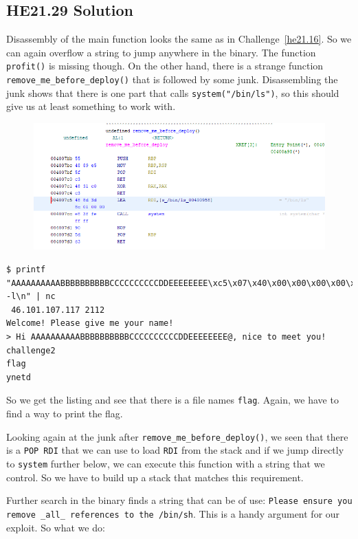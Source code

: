 \documentclass[english,a4paper,nols,noindent]{tufte-handout}
\begin{document}
\hypertarget{he21.29-solution}{%
\subsection{HE21.29 Solution}\label{he21.29-solution}}

\noindent Disassembly of the main function looks the same as in
Challenge~\ref{he21.16}.  So we can again overflow a string to jump anywhere in
the binary.  The function \verb+profit()+ is missing though.  On the other
hand, there is a strange function \verb+remove_me_before_deploy()+ that is
followed by some junk.  Disassembling the junk shows that there is one part
that calls \verb+system("/bin/ls")+, so this should give us at least something
to work with.

\begin{figure}
    \includegraphics[width=150mm]{ch29/remove_me_before_deploy.png}
\end{figure}

\begin{verbatim}
$ printf "AAAAAAAAAABBBBBBBBBBCCCCCCCCCCDDEEEEEEEE\xc5\x07\x40\x00\x00\x00\x00\x00\nls -l\n" | nc
 46.101.107.117 2112
Welcome! Please give me your name!
> Hi AAAAAAAAAABBBBBBBBBBCCCCCCCCCCDDEEEEEEEE@, nice to meet you!
challenge2
flag
ynetd
\end{verbatim} 

So we get the listing and see that there is a file names \verb+flag+.  Again,
we have to find a way to print the flag.

Looking again at the junk after \verb+remove_me_before_deploy()+, we seen that
there is a \verb+POP RDI+ that we can use to load \verb+RDI+ from the stack and
if we jump directly to \verb+system+ further below, we can execute this
function with a string that we control.  So we have to build up a stack that
matches this requirement.

Further search in the binary finds a string that can be of use: 
\verb+Please ensure you remove _all_ references to the /bin/sh+.  This is a handy argument for our exploit.  So what we do:
\end{document}
